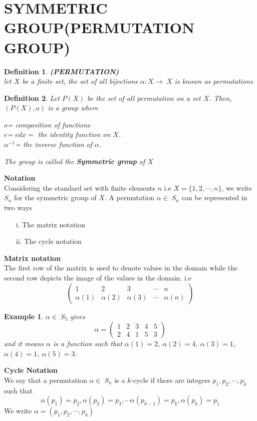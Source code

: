 \documentclass[a4paper, 12pt, openany]{report}
\newtheorem{defn}{Definition}[section]
\newtheorem{ex}{Example}[section]
\begin{document}
	\section{SYMMETRIC GROUP(PERMUTATION GROUP)}
	\begin{defn}\textbf{(PERMUTATION)}\\ let $X$ be a finite set, the set of all bijections $\alpha:X\rightarrow\;X$ is known as permutations\end{defn}
	\begin{defn} Let $P(X)$ be the set of all permutation on a set $X$. Then, 
	$(P(X),o)$ is a group where\\\begin{center}$o$= composition of 
functions\\$e$= $edx=$ the identity function on $X$.\\$\alpha^{-1}$= the inverse function of $\alpha$.\end{center}
		The group is  called the \textbf{Symmetric group} of $X$\end{defn}
	\textbf{Notation}\\Considering the standard set with finite elements $n$ i.e $X=\{1,2,\cdots,n\}$, we write $S_n$ for the symmetric group of $X$. A permutation $\alpha\in\;S_n$ can be represented in two ways
	\begin{itemize}
		\item [i.] The matrix notation \item [ii.] The cycle notation\end{itemize}
	\textbf{Matrix notation}\\ The first row of the matrix is used to denote values in the domain while the second row depicts the image of the values in the domain. i.e
	$$\begin{pmatrix}1&2&3&\cdots&n\\\alpha(1)&\alpha(2)&\alpha(3)&\cdots&\alpha(n)\end{pmatrix}$$
	\begin{ex}$\alpha\in\;S_5$ gives $$\alpha=\begin{pmatrix}1&2&3&4&5\\2&4&1&5&3\end{pmatrix}$$ and it means $\alpha$ is a function such that $\alpha(1)=2$, $\alpha(2)=4$, $\alpha(3)=1$, $\alpha(4)=1$, $\alpha(5)=3$.\end{ex}
	\textbf{Cycle Notation}\\ We say that a permutation $\alpha\in\;S_n$ is a $k$-cycle if there are integers $p_1,p_2,\cdots,p_k$ such that\\ $$\alpha(p_1)=p_2, \alpha(p_2)=p_3, \cdots\alpha(p_{k-1})=p_k, \alpha(p_k)=p_1$$We write $\alpha=(p_1,p_2,\cdots,p_k)$
\end{document}
